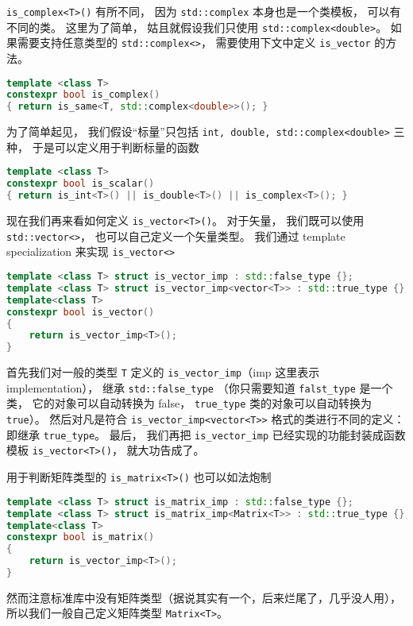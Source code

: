 \verb`is_complex<T>()` 有所不同， 因为 \verb`std::complex` 本身也是一个类模板， 可以有不同的类。 这里为了简单， 姑且就假设我们只使用 \verb`std::complex<double>`。 如果需要支持任意类型的 \verb`std::complex<>`， 需要使用下文中定义 \verb`is_vector` 的方法。
\begin{lstlisting}[language=cpp]
template <class T>
constexpr bool is_complex()
{ return is_same<T, std::complex<double>>(); }
\end{lstlisting}

为了简单起见， 我们假设“标量”只包括 \verb`int, double, std::complex<double>` 三种， 于是可以定义用于判断标量的函数
\begin{lstlisting}[language=cpp]
template <class T>
constexpr bool is_scalar()
{ return is_int<T>() || is_double<T>() || is_complex<T>(); }
\end{lstlisting}

现在我们再来看如何定义 \verb`is_vector<T>()`。 对于矢量， 我们既可以使用 \verb`std::vector<>`， 也可以自己定义一个矢量类型。 我们通过 template specialization 来实现 \verb`is_vector<>`
\begin{lstlisting}[language=cpp]
template <class T> struct is_vector_imp : std::false_type {};
template <class T> struct is_vector_imp<vector<T>> : std::true_type {};
template<class T>
constexpr bool is_vector()
{
    return is_vector_imp<T>();
}
\end{lstlisting}

首先我们对一般的类型 \verb`T` 定义的 \verb`is_vector_imp`（imp 这里表示 implementation）， 继承 \verb`std::false_type` （你只需要知道 \verb`falst_type` 是一个类， 它的对象可以自动转换为 false， \verb`true_type` 类的对象可以自动转换为 \verb`true`）。 然后对凡是符合 \verb`is_vector_imp<vector<T>>` 格式的类进行不同的定义： 即继承 \verb`true_type`。 最后， 我们再把 \verb`is_vector_imp` 已经实现的功能封装成函数模板 \verb`is_vector<T>()`， 就大功告成了。

用于判断矩阵类型的 \verb`is_matrix<T>()` 也可以如法炮制
\begin{lstlisting}[language=cpp]
template <class T> struct is_matrix_imp : std::false_type {};
template <class T> struct is_matrix_imp<Matrix<T>> : std::true_type {};
template<class T>
constexpr bool is_matrix()
{
    return is_vector_imp<T>();
}
\end{lstlisting}
然而注意标准库中没有矩阵类型（据说其实有一个，后来烂尾了，几乎没人用）， 所以我们一般自己定义矩阵类型 \verb`Matrix<T>`。
